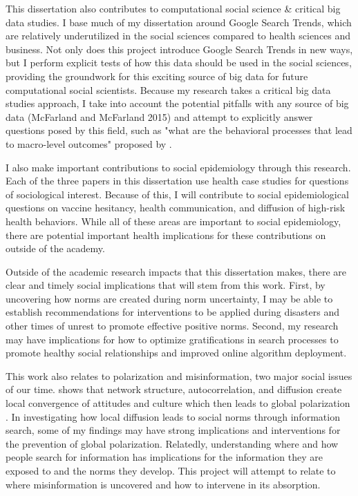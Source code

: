 This dissertation also contributes to computational social science \&
critical big data studies. I base much of my dissertation around Google
Search Trends, which are relatively underutilized in the social sciences
compared to health sciences and business. Not only does this project
introduce Google Search Trends in new ways, but I perform explicit tests
of how this data should be used in the social sciences, providing the
groundwork for this exciting source of big data for future computational
social scientists. Because my research takes a critical big data studies
approach, I take into account the potential pitfalls with any source of
big data (McFarland and McFarland 2015) and attempt to explicitly answer
questions posed by this field, such as "what are the behavioral
processes that lead to macro-level outcomes" proposed by \citet{breigerScaling2015}.

I also make important contributions to social epidemiology through this
research. Each of the three papers in this dissertation use health case
studies for questions of sociological interest. Because of this, I will
contribute to social epidemiological questions on vaccine hesitancy,
health communication, and diffusion of high-risk health behaviors. While
all of these areas are important to social epidemiology, there are
potential important health implications for these contributions on
outside of the academy.

Outside of the academic research impacts that this dissertation makes,
there are clear and timely social implications that will stem from this
work. First, by uncovering how norms are created during norm
uncertainty, I may be able to establish recommendations for
interventions to be applied during disasters and other times of unrest
to promote effective positive norms. Second, my research may have
implications for how to optimize gratifications in search processes to
promote healthy social relationships and improved online algorithm
deployment.

This work also relates to polarization and misinformation, two major
social issues of our time. \citet{axelrodDisseminationCultureModel1997} shows that network structure,
autocorrelation, and diffusion create local convergence of attitudes and
culture which then leads to global polarization \citep{dellapostaWhyLiberalsDrink2015}. In investigating how local diffusion leads to social norms
through information search, some of my findings may have strong
implications and interventions for the prevention of global
polarization. Relatedly, understanding where and how people search for
information has implications for the information they are exposed to and
the norms they develop. This project will attempt to relate to where
misinformation is uncovered and how to intervene in its absorption.

